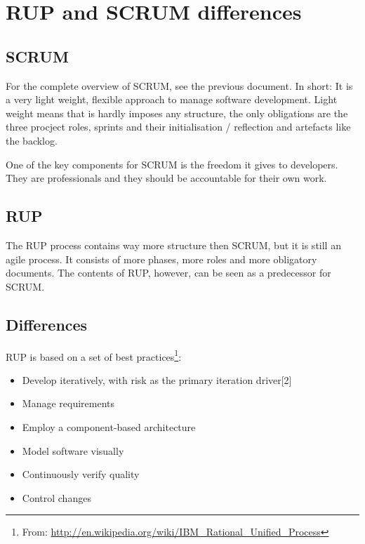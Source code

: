 \documentclass[]{uva-bachelor-thesis}
\title{\course}
\subtitle{\assignment}
\author{\group}
\begin{document}
\maketitle

\setlength{\parskip}{0px}
\tableofcontents
\setlength{\parskip}{.5em}

\clearpage

\chapter{RUP\cite{tenessentials} and SCRUM differences}

\section{SCRUM}
For the complete overview of SCRUM, see the previous document.
In short: It is a very light weight, flexible approach to manage software development. 
Light weight means that is hardly imposes any structure, the only obligations are the three procject roles, sprints and their initialisation / reflection and artefacts like the backlog. 

One of the key components for SCRUM is the freedom it gives to developers. 
They are professionals and they should be accountable for their own work. 

\section{RUP}
The RUP process contains way more structure then SCRUM, but it is still an agile process. 
It consists of more phases, more roles and more obligatory documents. 
The contents of RUP, however, can be seen as a predecessor for SCRUM. 

\section{Differences}
RUP is based on a set of best practices\footnote{From: \url{http://en.wikipedia.org/wiki/IBM_Rational_Unified_Process}}:
\begin{itemize}
  \item Develop iteratively, with risk as the primary iteration driver[2]
  \item Manage requirements
  \item Employ a component-based architecture
  \item Model software visually
  \item Continuously verify quality
  \item Control changes
\end{itemize}
\end{document}
